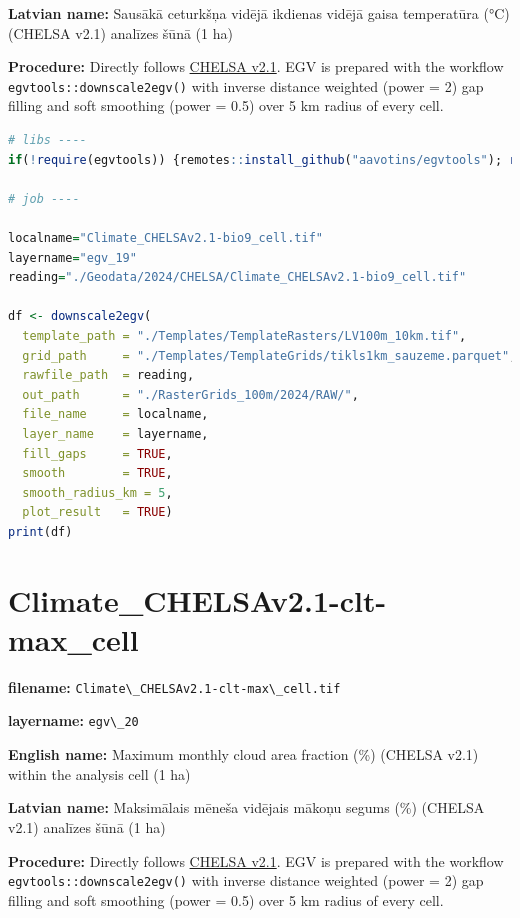 \documentclass[
]{book}
\newcommand{\passthrough}[1]{#1}
\begin{document}
\textbf{Latvian name:} Sausākā ceturkšņa vidējā ikdienas vidējā gaisa temperatūra (°C) (CHELSA v2.1) analīzes šūnā (1 ha)

\textbf{Procedure:} Directly follows \hyperref[Ch04.11]{CHELSA v2.1}. EGV is prepared with the
workflow \passthrough{\lstinline!egvtools::downscale2egv()!} with inverse distance weighted (power = 2)
gap filling and soft smoothing (power = 0.5) over 5 km radius of every cell.

\begin{lstlisting}[language=R]
# libs ----
if(!require(egvtools)) {remotes::install_github("aavotins/egvtools"); require(egvtools)}

# job ----

localname="Climate_CHELSAv2.1-bio9_cell.tif"
layername="egv_19"
reading="./Geodata/2024/CHELSA/Climate_CHELSAv2.1-bio9_cell.tif"

df <- downscale2egv(
  template_path = "./Templates/TemplateRasters/LV100m_10km.tif",
  grid_path     = "./Templates/TemplateGrids/tikls1km_sauzeme.parquet",
  rawfile_path  = reading,
  out_path      = "./RasterGrids_100m/2024/RAW/",
  file_name     = localname,
  layer_name    = layername,
  fill_gaps     = TRUE,
  smooth        = TRUE,
  smooth_radius_km = 5,
  plot_result   = TRUE)
print(df)
\end{lstlisting}

\section{Climate\_CHELSAv2.1-clt-max\_cell}\label{ch06.020}

\textbf{filename:} \passthrough{\lstinline!Climate\_CHELSAv2.1-clt-max\_cell.tif!}

\textbf{layername:} \passthrough{\lstinline!egv\_20!}

\textbf{English name:} Maximum monthly cloud area fraction (\%) (CHELSA v2.1) within the analysis cell (1 ha)

\textbf{Latvian name:} Maksimālais mēneša vidējais mākoņu segums (\%) (CHELSA v2.1) analīzes šūnā (1 ha)

\textbf{Procedure:} Directly follows \hyperref[Ch04.11]{CHELSA v2.1}. EGV is prepared with the
workflow \passthrough{\lstinline!egvtools::downscale2egv()!} with inverse distance weighted (power = 2)
gap filling and soft smoothing (power = 0.5) over 5 km radius of every cell.
\end{document}
